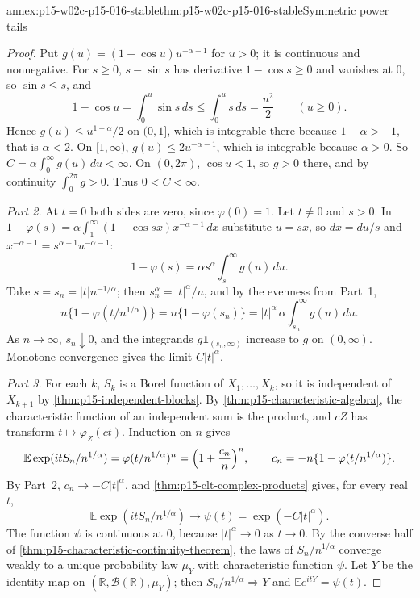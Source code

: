 \begin{annexitem}{annex:p15-w02c-p15-016-stable}{thm:p15-w02c-p15-016-stable}{Symmetric power tails}
\begin{proof}
Put \(g(u)=(1-\cos u)u^{-\alpha-1}\) for \(u>0\); it is continuous
and nonnegative. For \(s\geq0\), \(s-\sin s\) has derivative
\(1-\cos s\geq0\) and vanishes at \(0\), so \(\sin s\leq s\), and
\[
 1-\cos u=\int_0^u\sin s\,ds\leq\int_0^us\,ds=\frac{u^2}2
 \qquad(u\geq0).
\]
Hence \(g(u)\leq u^{1-\alpha}/2\) on \((0,1]\), which is integrable
there because \(1-\alpha>-1\), that is \(\alpha<2\). On
\([1,\infty)\), \(g(u)\leq2u^{-\alpha-1}\), which is integrable because
\(\alpha>0\). So \(C=\alpha\int_0^\infty g(u)\,du<\infty\). On
\((0,2\pi)\), \(\cos u<1\), so \(g>0\) there, and by continuity
\(\int_0^{2\pi}g>0\). Thus \(0<C<\infty\).

\emph{Part 2.} At \(t=0\) both sides are zero, since
\(\varphi(0)=1\). Let \(t\neq0\) and \(s>0\). In
\(1-\varphi(s)=\alpha\int_1^\infty(1-\cos sx)x^{-\alpha-1}\,dx\)
substitute \(u=sx\), so \(dx=du/s\) and
\(x^{-\alpha-1}=s^{\alpha+1}u^{-\alpha-1}\):
\[
 1-\varphi(s)=\alpha s^\alpha\int_s^\infty g(u)\,du .
\]
Take \(s=s_n=|t|n^{-1/\alpha}\); then \(s_n^\alpha=|t|^\alpha/n\), and
by the evenness from Part~1,
\[
 n\{1-\varphi(t/n^{1/\alpha})\}
 =n\{1-\varphi(s_n)\}
 =|t|^\alpha\,\alpha\int_{s_n}^\infty g(u)\,du .
\]
As \(n\to\infty\), \(s_n\downarrow0\), and the integrands
\(g\mathbf1_{(s_n,\infty)}\) increase to \(g\) on \((0,\infty)\).
Monotone convergence gives the limit \(C|t|^\alpha\).

\emph{Part 3.} For each \(k\), \(S_k\) is a Borel function of
\(X_1,\ldots,X_k\), so it is independent of \(X_{k+1}\) by
\cref{thm:p15-independent-blocks}. By
\cref{thm:p15-characteristic-algebra}, the characteristic function of
an independent sum is the product, and \(cZ\) has transform
\(t\mapsto\varphi_Z(ct)\). Induction on \(n\) gives
\[
 \mathbb E\exp(itS_n/n^{1/\alpha})=\varphi(t/n^{1/\alpha})^n
 =\Bigl(1+\frac{c_n}n\Bigr)^n,\qquad
 c_n=-n\{1-\varphi(t/n^{1/\alpha})\}.
\]
By Part~2, \(c_n\to-C|t|^\alpha\), and
\cref{thm:p15-clt-complex-products} gives, for every real \(t\),
\[
 \mathbb E\exp(itS_n/n^{1/\alpha})\to\psi(t)=\exp(-C|t|^\alpha).
\] The function \(\psi\) is continuous at \(0\),
because \(|t|^\alpha\to0\) as \(t\to0\). By the converse half of
\cref{thm:p15-characteristic-continuity-theorem}, the laws of
\(S_n/n^{1/\alpha}\) converge weakly to a unique probability law
\(\mu_Y\) with characteristic function \(\psi\). Let \(Y\) be the
identity map on \((\mathbb R,\mathcal B(\mathbb R),\mu_Y)\); then
\(S_n/n^{1/\alpha}\Rightarrow Y\) and \(\mathbb Ee^{itY}=\psi(t)\).


\end{proof}
\end{annexitem}

